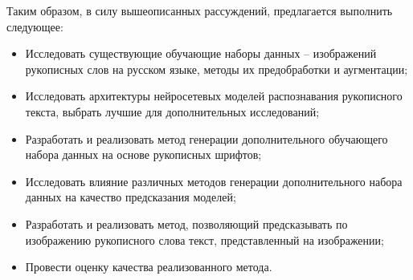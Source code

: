 Таким образом, в силу вышеописанных рассуждений, предлагается выполнить следующее:
\begin{itemize}
    \item Исследовать существующие обучающие наборы данных -- изображений рукописных слов на русском языке, методы их предобработки и аугментации;
    \item Исследовать архитектуры нейросетевых моделей распознавания рукописного текста, выбрать лучшие для дополнительных исследований;
    \item Разработать и реализовать метод генерации дополнительного обучающего набора данных на основе рукописных шрифтов;
    \item Исследовать влияние различных методов генерации дополнительного набора данных на качество предсказания моделей;
    \item Разработать и реализовать метод, позволяющий предсказывать по изображению рукописного слова текст, представленный на изображении;
    \item Провести оценку качества реализованного метода.
\end{itemize}
